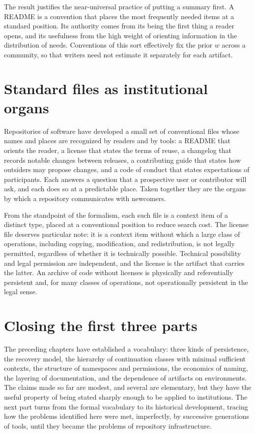 \documentclass[11pt,twoside,openright]{book}
\theoremstyle{plain}
\theoremstyle{definition}
\theoremstyle{remark}
\begin{document}
The result justifies the near-universal practice of putting a summary first. A README is a convention that places the most frequently needed items at a standard position. Its authority comes from its being the first thing a reader opens, and its usefulness from the high weight of orienting information in the distribution of needs. Conventions of this sort effectively fix the prior $w$ across a community, so that writers need not estimate it separately for each artifact.

\section{Standard files as institutional organs}

Repositories of software have developed a small set of conventional files whose names and places are recognized by readers and by tools: a README that orients the reader, a license that states the terms of reuse, a changelog that records notable changes between releases, a contributing guide that states how outsiders may propose changes, and a code of conduct that states expectations of participants. Each answers a question that a prospective user or contributor will ask, and each does so at a predictable place. Taken together they are the organs by which a repository communicates with newcomers.

From the standpoint of the formalism, each such file is a context item of a distinct type, placed at a conventional position to reduce search cost. The license file deserves particular note: it is a context item without which a large class of operations, including copying, modification, and redistribution, is not legally permitted, regardless of whether it is technically possible. Technical possibility and legal permission are independent, and the license is the artifact that carries the latter. An archive of code without licenses is physically and referentially persistent and, for many classes of operations, not operationally persistent in the legal sense.

\section{Closing the first three parts}

The preceding chapters have established a vocabulary: three kinds of persistence, the recovery model, the hierarchy of continuation classes with minimal sufficient contexts, the structure of namespaces and permissions, the economics of naming, the layering of documentation, and the dependence of artifacts on environments. The claims made so far are modest, and several are elementary, but they have the useful property of being stated sharply enough to be applied to institutions. The next part turns from the formal vocabulary to its historical development, tracing how the problems identified here were met, imperfectly, by successive generations of tools, until they became the problems of repository infrastructure.
\end{document}
